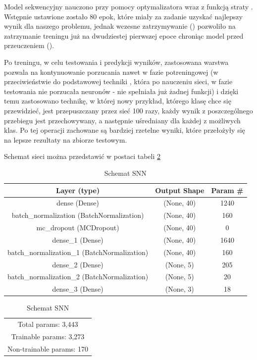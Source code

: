         Model sekwencyjny nauczono przy pomocy optymalizatora  \cite{adam} \cite{nadam} wraz z funkcją straty . Wstępnie ustawione zostało 80 epok, które miały za zadanie uzyskać najlepszy wynik dla naszego problemu, jednak wczesne zatrzymywanie () pozwoliło na zatrzymanie treningu już na dwudziestej pierwszej epoce chroniąc model przed przeuczeniem ().
        
        Po treningu, w celu testowania i predykcji wyników, zastosowana warstwa  pozwala na kontynuowanie porzucania nawet w fazie potreningowej (w przeciwieństwie do podstawowej techniki , która po nauczeniu sieci, w fazie testowania nie porzucała neuronów - nie spełniała już żadnej funkcji) i dzięki temu zastosowano technikę, w której nowy przykład, którego klasę chce się przewidzieć, jest przepuszczany przez sieć 100 razy, każdy wynik z poszczególnego przebiegu jest przechowywany, a następnie uśredniany dla każdej z możliwych klas. Po tej operacji zachowane są bardziej rzetelne wyniki, które przełożyły się na lepsze rezultaty na zbiorze testowym.
        
        Schemat sieci można przedstawić w postaci tabeli \ref{tab:SNNTable}
        \begin{table}[H]
            \centering
            \caption{Schemat SNN}
            \label{tab:SNNTable}
            \begin{tabular}{|c|c|c|}
            \hline
                Layer (type) &  Output Shape & Param \#\\ \hline \hline
                dense (Dense) & (None, 40) & 1240 \\ \hline
                batch\_normalization (BatchNormalization) & (None, 40) & 160 \\ \hline 
                mc\_dropout (MCDropout) & (None, 40) & 0 \\ \hline         
                dense\_1 (Dense) & (None, 40) & 1640 \\ \hline      
                batch\_normalization\_1 (BatchNormalization) & (None, 40) & 160 \\ \hline
                dense\_2 (Dense) & (None, 5) &  205 \\ \hline       
                batch\_normalization\_2 (BatchNormalization)  & (None, 5) &  20 \\ \hline
                dense\_3 (Dense) & (None, 3) &  18 \\ \hline \hline 
            \end{tabular}
            	\begin{tabular} {| c |}
                Total params: 3,443 \\
                Trainable params: 3,273 \\
                Non-trainable params: 170 \\
                \hline
                \end{tabular}
        \end{table}
